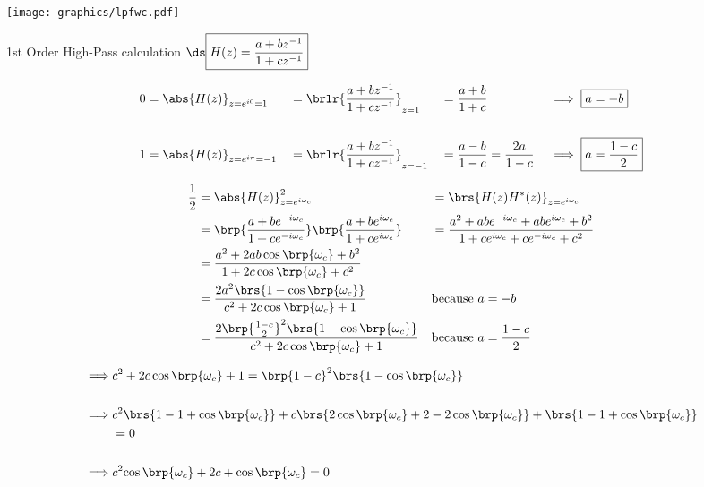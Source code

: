 \texttt{[image: graphics/lpfwc.pdf]}




1st Order High-Pass calculation
$\ds\boxed{ H(z) = \frac{a + bz^{-1}}
                        {1 + cz^{-1}}
          }$

\begin{align*}
  0 &= {\abs{H(z)}}_{z=e^{i0}=1}    
    &&=\brlr{\frac{a + bz^{-1}}{1 + cz^{-1}}}_{z=1} 
    &&=\frac{a + b}{1 + c}                   
    && \implies \boxed{a=-b}
  \\\\
  1 &= \abs{H(z)}_{z=e^{i\pi}=-1} 
   &&= \brlr{\frac{a + bz^{-1}}{1 + cz^{-1}}}_{z=-1} 
   &&= \frac{a - b}{1 - c} = \frac{2a}{1-c}                   
   &&  \implies \boxed{a=\frac{1-c}{2}}
\end{align*}


%
\begin{align*}
  \frac{1}{2}
    &= \abs{H(z)}^2_{z=e^{i\omega_c}}
   &&= \brs{H(z)H^\ast(z)}_{z=e^{i\omega_c}}
  \\&= \brp{\frac{a + be^{-i\omega_c}}{1 + ce^{-i\omega_c}}}
       \brp{\frac{a + be^{i\omega_c}}{1 + ce^{i\omega_c}}}
   &&= \frac{a^2 + abe^{-i\omega_c} + abe^{i\omega_c} + b^2}
            {1   +  ce^{i\omega_c} +  ce^{-i\omega_c} + c^2}
  \\&= \frac{a^2 + 2ab\cos\brp{\omega_c} + b^2}
            {1   + 2 c\cos\brp{\omega_c} + c^2}
  \\&= \frac{2a^2\brs{1 -  \cos\brp{\omega_c}}}
            {c^2 + 2 c\cos\brp{\omega_c} + 1}
    && \text{because $a=-b$}
  \\&= \frac{2\brp{\frac{1-c}{2}}^2\brs{1 -  \cos\brp{\omega_c}}}
            {c^2 + 2 c\cos\brp{\omega_c} + 1}
    && \text{because $a=\frac{1-c}{2}$}
\end{align*}


{\begin{align*}
    \implies &c^2 + 2 c\cos\brp{\omega_c} + 1 
             = \brp{1-c}^2\brs{1 -  \cos\brp{\omega_c}}
  \\\\\implies & c^2\brs{1-1+\cos\brp{\omega_c}} 
             + c  \brs{2\cos\brp{\omega_c}+2-2\cos\brp{\omega_c}}
             +    \brs{1-1+\cos\brp{\omega_c}}
             \\&= 0
  \\\\\implies & c^2{\cos\brp{\omega_c}} 
             + 2c 
             +    \cos\brp{\omega_c}
             = 0
\end{align*}}



